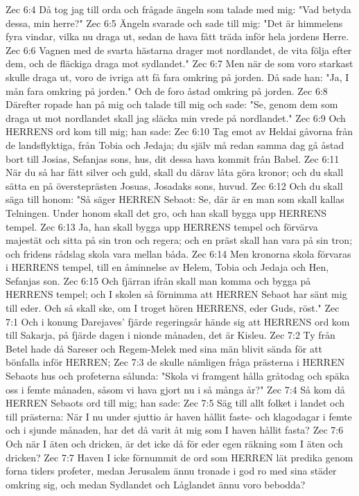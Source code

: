 Zec 6:4  Då tog jag till orda och frågade ängeln som talade med mig: "Vad betyda dessa, min herre?"
Zec 6:5  Ängeln svarade och sade till mig: "Det är himmelens fyra vindar, vilka nu draga ut, sedan de hava fått träda inför hela jordens Herre.
Zec 6:6  Vagnen med de svarta hästarna drager mot nordlandet, de vita följa efter dem, och de fläckiga draga mot sydlandet."
Zec 6:7  Men när de som voro starkast skulle draga ut, voro de ivriga att få fara omkring på jorden. Då sade han: "Ja, I mån fara omkring på jorden." Och de foro åstad omkring på jorden.
Zec 6:8  Därefter ropade han på mig och talade till mig och sade: "Se, genom dem som draga ut mot nordlandet skall jag släcka min vrede på nordlandet."
Zec 6:9  Och HERRENS ord kom till mig; han sade:
Zec 6:10  Tag emot av Heldai gåvorna från de landsflyktiga, från Tobia och Jedaja; du själv må redan samma dag gå åstad bort till Josias, Sefanjas sons, hus, dit dessa hava kommit från Babel.
Zec 6:11  När du så har fått silver och guld, skall du därav låta göra kronor; och du skall sätta en på översteprästen Josuas, Josadaks sons, huvud.
Zec 6:12  Och du skall säga till honom: "Så säger HERREN Sebaot: Se, där är en man som skall kallas Telningen. Under honom skall det gro, och han skall bygga upp HERRENS tempel.
Zec 6:13  Ja, han skall bygga upp HERRENS tempel och förvärva majestät och sitta på sin tron och regera; och en präst skall han vara på sin tron; och fridens rådslag skola vara mellan båda.
Zec 6:14  Men kronorna skola förvaras i HERRENS tempel, till en åminnelse av Helem, Tobia och Jedaja och Hen, Sefanjas son.
Zec 6:15  Och fjärran ifrån skall man komma och bygga på HERRENS tempel; och I skolen så förnimma att HERREN Sebaot har sänt mig till eder. Och så skall ske, om I troget hören HERRENS, eder Guds, röst."
Zec 7:1  Och i konung Darejaves' fjärde regeringsår hände sig att HERRENS ord kom till Sakarja, på fjärde dagen i nionde månaden, det är Kisleu.
Zec 7:2  Ty från Betel hade då Sareser och Regem-Melek med sina män blivit sända för att bönfalla inför HERREN;
Zec 7:3  de skulle nämligen fråga prästerna i HERREN Sebaots hus och profeterna sålunda: "Skola vi framgent hålla gråtodag och späka oss i femte månaden, såsom vi hava gjort nu i så många år?"
Zec 7:4  Så kom då HERREN Sebaots ord till mig; han sade:
Zec 7:5  Säg till allt folket i landet och till prästerna: När I nu under sjuttio år haven hållit faste- och klagodagar i femte och i sjunde månaden, har det då varit åt mig som I haven hållit fasta?
Zec 7:6  Och när I äten och dricken, är det icke då för eder egen räkning som I äten och dricken?
Zec 7:7  Haven I icke förnummit de ord som HERREN lät predika genom forna tiders profeter, medan Jerusalem ännu tronade i god ro med sina städer omkring sig, och medan Sydlandet och Låglandet ännu voro bebodda?
